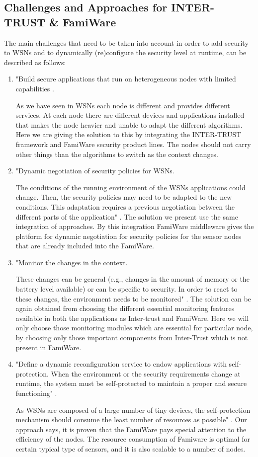 \documentclass[12pt,a4paper,twoside]{report}
\begin{document}
\subsection{Challenges and Approaches for INTER-TRUST \& FamiWare}
The main challenges that need to be taken into account in order to add security to WSNs and to dynamically (re)configure the security level at runtime, can be described as follows:
\begin{enumerate}
	\item  "Build secure applications that run on heterogeneous nodes with limited capabilities \cite{Pinto;etal:2013}.\par
As we have seen in WSNs each node is different and provides different services. At each node there are different devices and applications installed that makes the node heavier and unable to adapt the different algorithms. Here we are giving the solution to this by integrating the INTER-TRUST framework and FamiWare security product lines. The nodes should not carry other things than the algorithms to switch as the context changes.
	\item  "Dynamic negotiation of security policies for WSNs.\par
	The conditions of the running environment of the WSNs applications could change. Then, the security policies may need to be adapted to the new conditions. This adaptation requires a previous negotiation between the different parts of the application" \cite{Pinto;etal:2013}. The solution we present use the same integration of approaches. By this integration FamiWare middleware gives the platform for dynamic negotiation for security policies for the sensor nodes that are already included into the FamiWare.
	\item  "Monitor the changes in the context.\par
	These changes can be general (e.g., changes in the amount of memory or the battery level available) or can be specific to security. In order to react to these changes, the environment needs to be monitored" \cite{Pinto;etal:2013}. The solution can be again obtained from choosing the different essential monitoring features available in both the applications as Inter-trust and FamiWare. Here we will only choose those monitoring modules which are essential for particular node, by choosing only those important components from Inter-Trust which is not present in FamiWare.  
	\item "Define a dynamic reconfiguration service to endow applications with self-protection.
When the environment or the security requirements change at runtime, the system must be self-protected to maintain a proper and secure functioning" \cite{Pinto;etal:2013}. \par
As WSNs are composed of a large number of tiny devices, the self-protection mechanism should consume the least number of resources as possible" \cite{Pinto;etal:2013}. Our approach says, it is proven that the FamiWare pays special attention to the efficiency of the nodes. The resource consumption of Famiware is optimal for certain typical type of sensors, and it is also scalable to a number of nodes.
\end{enumerate}
\end{document}
